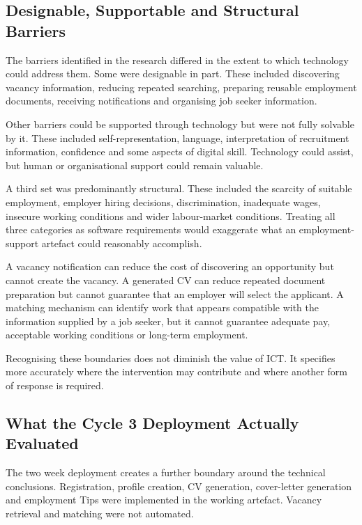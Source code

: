 \subsection{Designable, Supportable and Structural Barriers}
\label{sec:designable-barriers}

The barriers identified in the research differed in the extent to which technology could address them. Some were designable in part. These included discovering vacancy information, reducing repeated searching, preparing reusable employment documents, receiving notifications and organising job seeker information.

Other barriers could be supported through technology but were not fully solvable by it. These included self-representation, language, interpretation of recruitment information, confidence and some aspects of digital skill. Technology could assist, but human or organisational support could remain valuable.

A third set was predominantly structural. These included the scarcity of suitable employment, employer hiring decisions, discrimination, inadequate wages, insecure working conditions and wider labour-market conditions. Treating all three categories as software requirements would exaggerate what an employment-support artefact could reasonably accomplish.

A vacancy notification can reduce the cost of discovering an opportunity but cannot create the vacancy. A generated CV can reduce repeated document preparation but cannot guarantee that an employer will select the applicant. A matching mechanism can identify work that appears compatible with the information supplied by a job seeker, but it cannot guarantee adequate pay, acceptable working conditions or long-term employment.

Recognising these boundaries does not diminish the value of ICT. It specifies more accurately where the intervention may contribute and where another form of response is required.


\subsection{What the Cycle 3 Deployment Actually Evaluated}

The two week deployment creates a further boundary around the technical conclusions. Registration, profile creation, CV generation, cover-letter generation and employment Tips were implemented in the working artefact. Vacancy retrieval and matching were not automated.

